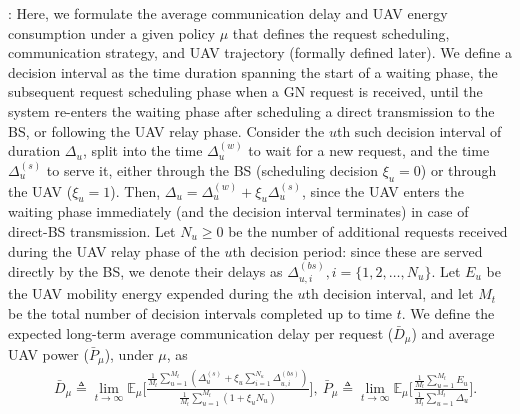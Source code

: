 \documentclass[12pt, draftcls, onecolumn]{IEEEtran}
\theoremstyle{plain}
\theoremstyle{definition}
\theoremstyle{remark}
\begin{document}
: Here, we formulate the average communication delay and UAV energy consumption under a given policy $\mu$ that defines the request scheduling, communication strategy, and UAV trajectory (formally defined later). We define a decision interval as the time duration spanning the start of a waiting phase, the subsequent {request scheduling} phase when a GN request is received, until the system re-enters the waiting phase after scheduling a direct transmission to the BS, or following the {UAV relay} phase. Consider the $u$th such decision interval of duration $\Delta_{u}$, split into the time $\Delta_{u}^{(w)}$ to wait for a new request, and the time $\Delta_{u}^{(s)}$ to serve it, either through the BS (scheduling decision $\xi_{u}{=}0$) or through the UAV ($\xi_{u}{=}1$). Then, $\Delta_{u}{=}\Delta_{u}^{(w)}{+}\xi_{u}\Delta_{u}^{(s)}$, since the UAV enters the {waiting phase} immediately (and the decision interval terminates) in case of direct-BS transmission. Let $N_{u}{\geq}0$ be the number of additional requests received during the UAV relay phase of the $u$th decision period: since these are served directly by the BS, we denote their delays as $\Delta_{u,i}^{(bs)},i{=}\{1,2,{\dots},N_{u}\}$. Let $E_{u}$ be the UAV mobility energy expended during the $u$th decision interval, and let $M_{t}$ be the total number of decision intervals completed up to time $t$. We define the expected long-term average communication delay per request ($\bar{D}_{\mu}$) and average UAV power ($\bar{P}_{\mu}$), under $\mu$, as
\begin{align}\label{eq:DBarMu}
    &\bar{D}_{\mu} \triangleq \lim_{t \rightarrow \infty} \mathbb{E}_{\mu} \Bigg[\frac{\frac{1}{M_t}\sum_{u=1}^{M_t}(\Delta_u^{(s)} + \xi_u\sum_{i=1}^{N_u}\Delta_{u, i}^{(bs)})}{\frac{1}{M_t}\sum_{u=1}^{M_t}(1 + \xi_u N_u)}\Bigg],\ \bar{P}_{\mu} \triangleq \lim_{t \rightarrow \infty} \mathbb{E}_{\mu} \Bigg[ \frac{\frac{1}{M_t}\sum_{u=1}^{M_t}E_u}{\frac{1}{M_t}\sum_{u=1}^{M_t}\Delta_u}\Bigg].
\end{align}
\end{document}
